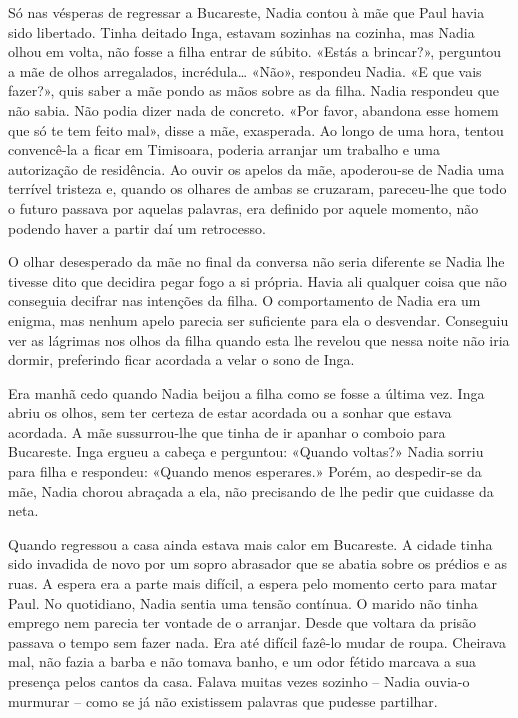 Só nas vésperas de regressar a Bucareste, Nadia contou à mãe que Paul
havia sido libertado. Tinha deitado Inga, estavam sozinhas na cozinha,
mas Nadia olhou em volta, não fosse a filha entrar de súbito. «Estás a
brincar?», perguntou a mãe de olhos arregalados, incrédula\ldots{}
«Não», respondeu Nadia. «E que vais fazer?», quis saber a mãe pondo as
mãos sobre as da filha. Nadia respondeu que não sabia. Não podia dizer
nada de concreto. «Por favor, abandona esse homem que só te tem feito
mal», disse a mãe, exasperada. Ao longo de uma hora, tentou convencê-la
a ficar em Timisoara, poderia arranjar um trabalho e uma autorização de
residência. Ao ouvir os apelos da mãe, apoderou-se de Nadia uma terrível
tristeza e, quando os olhares de ambas se cruzaram, pareceu-lhe que todo
o futuro passava por aquelas palavras, era definido por aquele momento,
não podendo haver a partir daí um retrocesso.

O olhar desesperado da mãe no final da conversa não
seria diferente se Nadia lhe tivesse dito que decidira pegar
fogo a si própria. Havia ali qualquer coisa que não conseguia decifrar
nas intenções da filha. O comportamento de Nadia era um enigma, mas
nenhum apelo parecia ser suficiente para ela o desvendar. Conseguiu ver
as lágrimas nos olhos da filha quando esta lhe revelou que nessa noite
não iria dormir, preferindo ficar acordada a velar o sono de Inga.

Era manhã cedo quando Nadia beijou a filha como se fosse a última vez.
Inga abriu os olhos, sem ter certeza de estar acordada ou a sonhar que
estava acordada. A mãe sussurrou-lhe que tinha de ir apanhar o comboio
para Bucareste. Inga ergueu a cabeça e perguntou: «Quando voltas?» Nadia
sorriu para filha e respondeu: «Quando menos esperares.» Porém, ao
despedir-se da mãe, Nadia chorou abraçada a ela, não precisando de lhe
pedir que cuidasse da neta.

Quando regressou a casa ainda estava mais calor em Bucareste. A cidade
tinha sido invadida de novo por um sopro abrasador que se abatia sobre
os prédios e as ruas. A espera era a parte mais difícil, a espera pelo
momento certo para matar Paul. No quotidiano, Nadia sentia uma tensão
contínua. O marido não tinha emprego nem parecia ter vontade de o
arranjar. Desde que voltara da prisão passava o tempo sem fazer nada.
Era até difícil fazê-lo mudar de roupa. Cheirava mal, não fazia a barba
e não tomava banho, e um odor fétido marcava a sua presença pelos cantos
da casa. Falava muitas vezes sozinho -- Nadia ouvia-o murmurar -- como
se já não existissem palavras que pudesse partilhar.

